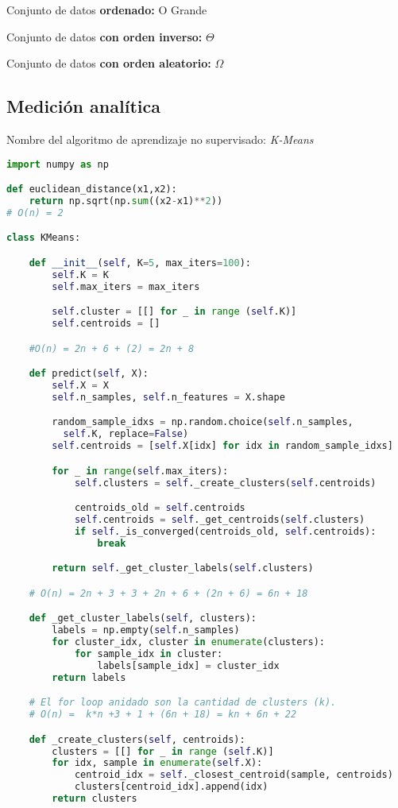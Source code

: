 \documentclass{article}
\begin{document}
Conjunto de datos \textbf{ordenado:} O Grande

Conjunto de datos \textbf{con orden inverso:} \(\Theta\)

Conjunto de datos \textbf{con orden aleatorio:} \(\Omega\)

\newpage
\subsection{Medición analítica}
Nombre del algoritmo de aprendizaje no supervisado: \textit{K-Means}
\begin{lstlisting}[language=Python]
import numpy as np

def euclidean_distance(x1,x2):
    return np.sqrt(np.sum((x2-x1)**2))
# O(n) = 2

class KMeans:

    def __init__(self, K=5, max_iters=100):
        self.K = K
        self.max_iters = max_iters

        self.cluster = [[] for _ in range (self.K)]
        self.centroids = []

    #O(n) = 2n + 6 + (2) = 2n + 8

    def predict(self, X):
        self.X = X
        self.n_samples, self.n_features = X.shape

        random_sample_idxs = np.random.choice(self.n_samples,
          self.K, replace=False)
        self.centroids = [self.X[idx] for idx in random_sample_idxs]

        for _ in range(self.max_iters):
            self.clusters = self._create_clusters(self.centroids)

            centroids_old = self.centroids
            self.centroids = self._get_centroids(self.clusters)
            if self._is_converged(centroids_old, self.centroids):
                break

        return self._get_cluster_labels(self.clusters)

    # O(n) = 2n + 3 + 3 + 2n + 6 + (2n + 6) = 6n + 18

    def _get_cluster_labels(self, clusters):
        labels = np.empty(self.n_samples)
        for cluster_idx, cluster in enumerate(clusters):
            for sample_idx in cluster:
                labels[sample_idx] = cluster_idx
        return labels

    # El for loop anidado son la cantidad de clusters (k).
    # O(n) =  k*n +3 + 1 + (6n + 18) = kn + 6n + 22

    def _create_clusters(self, centroids):
        clusters = [[] for _ in range (self.K)]
        for idx, sample in enumerate(self.X):
            centroid_idx = self._closest_centroid(sample, centroids)
            clusters[centroid_idx].append(idx)
        return clusters


\end{lstlisting}
\end{document}
